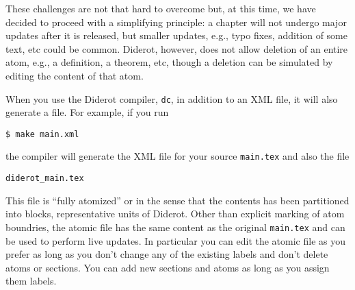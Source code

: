 \begin{gram}
These challenges are not that hard to overcome but, at this time, we have decided to proceed with a simplifying principle: a chapter will not undergo major updates after it is released, but smaller updates, e.g., typo fixes, addition of some text, etc could be common. 
%
Diderot, however, does not allow deletion of an entire atom, e.g., a definition, a theorem, etc, though a deletion can be simulated by editing the content of that atom.
\end{gram}

\begin{gram}
\label{grm:publisg::diderot-atomic}
When you use the Diderot compiler, \lstinline`dc`, in addition to an XML file, it will also generate a  file.  For example, if you run 

\lstinline`$ make main.xml`

the compiler will generate the XML file for your source \lstinline`main.tex` and also the file 

\lstinline`diderot_main.tex`

This file is ``fully atomized'' or  in the sense that the contents has been partitioned into  blocks, representative units of Diderot.
%
Other than explicit marking of atom boundries, the atomic file has the same content as the original \lstinline`main.tex`
%
and can be used to perform live updates. In particular you can edit the atomic file as you prefer as long as you don't change any of the existing labels and don't delete atoms or sections.  You can add new sections and atoms as long as you assign them labels.
 
\end{gram}


